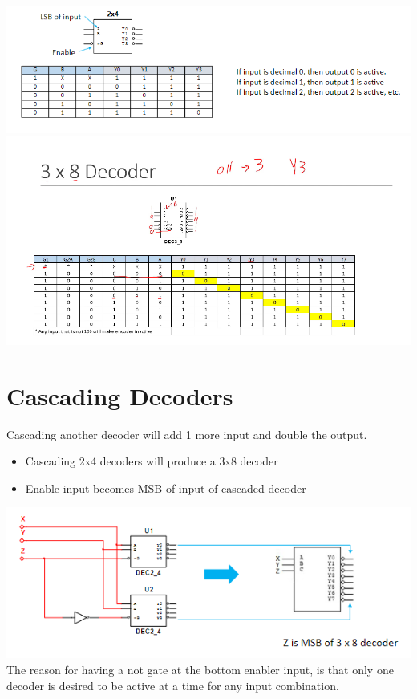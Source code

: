 \documentclass[a4paper,12pt]{article}
\begin{document}
          \includegraphics[width=20cm]{Two4Decoder.png}
          \includegraphics[width=20cm]{3x8decoder.png}
          \hrulefill

          \section*{Cascading Decoders}
            Cascading another decoder will add 1 more input and double the output.
            \begin{itemize}
                \item Cascading 2x4 decoders will produce a 3x8 decoder
                \item Enable input becomes MSB of input of cascaded decoder
            \end{itemize}
            \includegraphics[width=15cm]{CascadingDecoder.png}\\
            The reason for having a not gate at the bottom enabler input, is that only one decoder is desired to be active at a time for any input combination. \vspace*{10pt}
\end{document}
